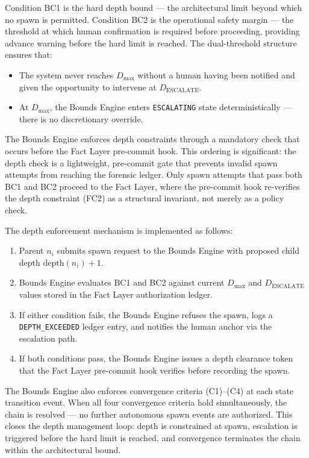 Condition BC1 is the hard depth bound — the architectural limit beyond which no spawn is permitted. Condition BC2 is the operational safety margin — the threshold at which human confirmation is required before proceeding, providing advance warning before the hard limit is reached. The dual-threshold structure ensures that:

\begin{itemize}
    \item The system never reaches $D_{\max}$ without a human having been notified and given the opportunity to intervene at $D_{\text{ESCALATE}}$.
    \item At $D_{\max}$, the Bounds Engine enters \texttt{ESCALATING} state deterministically — there is no discretionary override.
\end{itemize}

The Bounds Engine enforces depth constraints through a mandatory check that occurs before the Fact Layer pre-commit hook. This ordering is significant: the depth check is a lightweight, pre-commit gate that prevents invalid spawn attempts from reaching the forensic ledger. Only spawn attempts that pass both BC1 and BC2 proceed to the Fact Layer, where the pre-commit hook re-verifies the depth constraint (FC2) as a structural invariant, not merely as a policy check.

The depth enforcement mechanism is implemented as follows:

\begin{enumerate}
    \item Parent $n_i$ submits spawn request to the Bounds Engine with proposed child depth $\text{depth}(n_i) + 1$.
    \item Bounds Engine evaluates BC1 and BC2 against current $D_{\max}$ and $D_{\text{ESCALATE}}$ values stored in the Fact Layer authorization ledger.
    \item If either condition fails, the Bounds Engine refuses the spawn, logs a \texttt{DEPTH\_EXCEEDED} ledger entry, and notifies the human anchor via the escalation path.
    \item If both conditions pass, the Bounds Engine issues a depth clearance token that the Fact Layer pre-commit hook verifies before recording the spawn.
\end{enumerate}

The Bounds Engine also enforces convergence criteria (C1)–(C4) at each state transition event. When all four convergence criteria hold simultaneously, the chain is resolved — no further autonomous spawn events are authorized. This closes the depth management loop: depth is constrained at spawn, escalation is triggered before the hard limit is reached, and convergence terminates the chain within the architectural bound.

